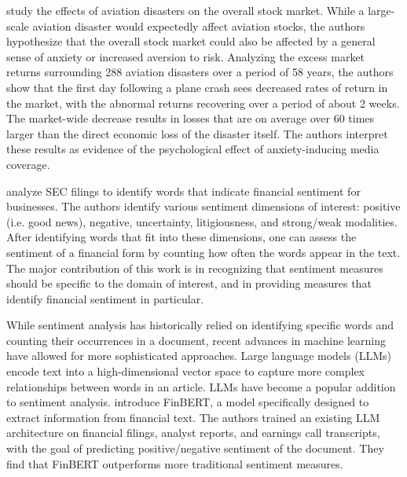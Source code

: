 \documentclass[12pt]{article}
\begin{document}
\textcite{kaplanski2010sentiment} study the effects of aviation disasters on the overall stock market. While a large-scale aviation disaster would expectedly affect aviation stocks, the authors hypothesize that the overall stock market could also be affected by a general sense of anxiety or increased aversion to risk. Analyzing the excess market returns surrounding 288 aviation disasters over a period of 58 years, the authors show that the first day following a plane crash sees decreased rates of return in the market, with the abnormal returns recovering over a period of about 2 weeks. The market-wide decrease results in losses that are on average over 60 times larger than the direct economic loss of the disaster itself. The authors interpret these results as evidence of the psychological effect of anxiety-inducing media coverage.

\textcite{loughran2011liability} analyze SEC filings to identify words that indicate financial sentiment for businesses. The authors identify various sentiment dimensions of interest: positive (i.e. good news), negative, uncertainty, litigiousness, and strong/weak modalities. After identifying words that fit into these dimensions, one can assess the sentiment of a financial form by counting how often the words appear in the text. The major contribution of this work is in recognizing that sentiment measures should be specific to the domain of interest, and in providing measures that identify financial sentiment in particular.

While sentiment analysis has historically relied on identifying specific words and counting their occurrences in a document, recent advances in machine learning have allowed for more sophisticated approaches. Large language models (LLMs) encode text into a high-dimensional vector space to capture more complex relationships between words in an article. LLMs have become a popular addition to sentiment analysis. \textcite{huang2023finbert} introduce FinBERT, a model specifically designed to extract information from financial text. The authors trained an existing LLM architecture on financial filings, analyst reports, and earnings call transcripts, with the goal of predicting positive/negative sentiment of the document. They find that FinBERT outperforms more traditional sentiment measures.
\end{document}
